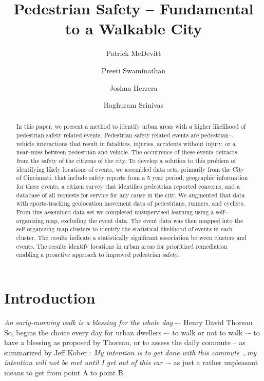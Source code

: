 \documentclass{llncs}
\begin{document}
\setlength{\parskip}{0pt}
%
%
\title{Pedestrian Safety -- Fundamental to a Walkable City}
%
\author{Patrick McDevitt \and Preeti Swaminathan
\and Joshua Herrera \and Raghuram Srinivas}
%

\maketitle              %

\begin{abstract}
In this paper, we present a method to identify urban areas with a higher likelihood of pedestrian safety related events. Pedestrian safety related events are pedestrian–-vehicle interactions that result in fatalities, injuries, accidents without injury, or a near--miss between pedestrian and vehicle. The occurrence of these events detracts from the safety of the citizens of the city. To develop a solution to this problem of identifying likely locations of events, we assembled data sets, primarily from the City of Cincinnati, that include safety reports from a 5 year period, geographic information for these events, a citizen survey that identifies pedestrian reported concerns, and a database of all requests for service for any cause in the city. We augmented that data with sports-tracking geolocation movement data of pedestrians, runners, and cyclists. From this assembled data set we completed unsupervised learning using a self--organizing map, excluding the event data. The event data was then mapped into the self-organizing map clusters to identify the statistical likelihood of events in each cluster. The results indicate a statistically significant association between clusters and events. The results identify locations in urban areas for prioritized remediation enabling a proactive approach to improved pedestrian safety.
\end{abstract}
%
\section{Introduction}
%
\emph{An early-morning walk is a blessing for the whole day} -– Henry David Thoreau \cite{thoreau1906writings}. So, begins the choice every day for urban dwellers -– to walk or not to walk –- to have a blessing as proposed by Thoreau, or to assess the daily commute -- as summarized by Jeff Kober \cite{bowen2015zen}: \emph{My intention is to get done with this commute \dots my intention will not be met until I get out of this car} –- as just a rather unpleasant means to get from point A to point B.
\end{document}
